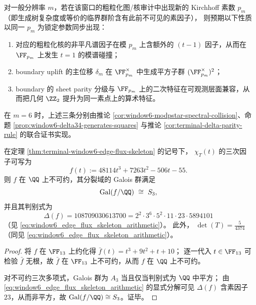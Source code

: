 \begin{conjecture}[素数—边界—谱的三联锁定原则]\label{conj:window-prime-bdry-spectrum-triple-lock}
对一般分辨率 \(m\)，若在该窗口的粗粒化图/核审计中出现新的 Kirchhoff 素数 \(p_m\)（即生成树复杂度或等价的临界群阶含有此前不可见的素因子），
则预期以下性质以同一 \(p_m\) 为锁定参数同步出现：
\begin{enumerate}
  \item 对应的粗粒化核的非平凡谱因子在模 \(p_m\) 上含额外的 \((t-1)\) 因子，从而在 \(\FF_{p_m}\) 上发生 \(t=1\) 的模谱碰撞；
  \item boundary uplift 的主位移 \(\delta_m\) 在 \(\FF_{p_m}^\times\) 中生成平方子群 \((\FF_{p_m}^\times)^2\)；
  \item boundary 的 sheet parity 分级与 \(\FF_{p_m}\) 上的二次特征在可观测层面兼容，从而把几何 \(\ZZ_2\) 提升为同一素点上的算术特征。
\end{enumerate}
在 \(m=6\) 时，上述三条分别由推论 \ref{cor:window6-modpstar-spectral-collision}、命题 \ref{prop:window6-delta34-generates-squares} 与推论 \ref{cor:terminal-delta-parity-rule} 的联合证书实现。
\end{conjecture}

\begin{corollary}[四状态粗粒化核的代数数论指纹：\texorpdfstring{$\mathrm{Gal}\cong S_3$}{Gal=S3} 与判别式含 \texorpdfstring{$23$}{23}]\label{cor:window6-edge-flux-coarse-markov-galois}
在定理 \ref{thm:terminal-window6-edge-flux-skeleton} 的记号下，
\(\chi_T(t)\) 的三次因子可写为
\[
f(t):=48114t^3+7263t^2-506t-55.
\]
则 \(f\) 在 \(\QQ\) 上不可约，其分裂域的 Galois 群满足
\[
\mathrm{Gal}(f/\QQ)\ \cong\ S_3,
\]
并且其判别式为
\[
\Delta(f)=108709030613700
=2^2\cdot 3^6\cdot 5^2\cdot 11\cdot 23\cdot 5894101
\]
（见 \eqref{eq:window6_edge_flux_skeleton_arithmetic}）。
此外，
\(\det(T)=\frac{5}{4374}\)（同见 \eqref{eq:window6_edge_flux_skeleton_arithmetic}）。
\end{corollary}
\begin{proof}
将 \(f\) 在 \(\FF_{13}\) 上约化得
\(
\bar f(t)=t^3+9t^2+t+10
\)；
逐一代入 \(t\in\FF_{13}\) 可检验 \(\bar f\) 无根，故 \(\bar f\) 在 \(\FF_{13}\) 上不可约，从而 \(f\) 在 \(\QQ\) 上不可约。
\par
对不可约三次多项式，Galois 群为 \(A_3\) 当且仅当判别式为 \(\QQ\) 中平方；
由 \eqref{eq:window6_edge_flux_skeleton_arithmetic} 的显式分解可见 \(\Delta(f)\) 含素因子 \(23\)，从而非平方，故 \(\mathrm{Gal}(f/\QQ)\cong S_3\)。证毕。
\end{proof}

